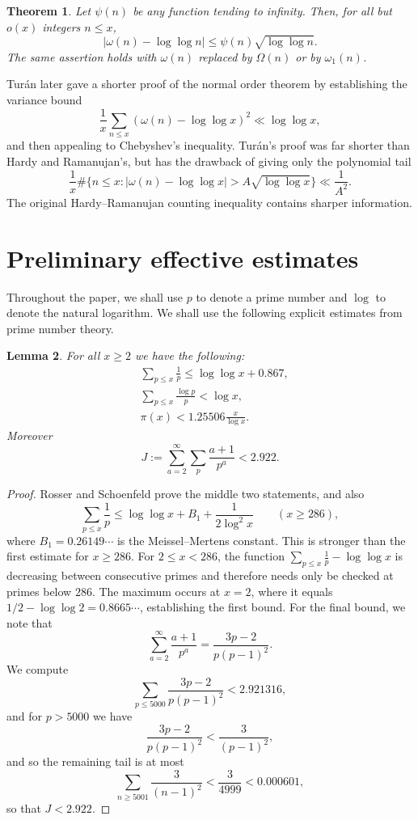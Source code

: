 \documentclass[12pt,a4paper,reqno]{amsart}
\theoremstyle{plain}
\newtheorem{thrm}{Theorem}[section]
\newtheorem{lmm}[thrm]{Lemma}
\numberwithin{sblmm}{thrm}
\numberwithin{equation}{section}
\begin{document}
\begin{thrm}\label{thm:original_HR_theorem}
    Let $\psi(n)$ be any function tending to infinity. Then, for all but $o(x)$ integers $n\le x$,
    $$|\omega(n)-\log\log n|\le\psi(n)\sqrt{\log\log n}.$$
    The same assertion holds with $\omega(n)$ replaced by $\Omega(n)$ or by $\omega_1(n)$.
\end{thrm}
Tur\'{a}n \cite{Turan1934} later gave a shorter proof of the normal order theorem by establishing the variance bound
$$\frac{1}{x}\sum_{n\le x}(\omega(n)-\log\log x)^2\ll \log\log x,$$
and then appealing to Chebyshev's inequality. Tur\'{a}n's proof was far shorter than Hardy and Ramanujan's, but has the drawback of giving only the polynomial tail 
$$\frac{1}{x}\#\{n\le x:|\omega(n)-\log\log x|>A\sqrt{\log\log x}\}\ll\frac{1}{A^2}.$$
The original Hardy--Ramanujan counting inequality contains sharper information.



\section{Preliminary effective estimates}
Throughout the paper, we shall use $p$ to denote a prime number and $\log$ to denote the natural logarithm. We shall use the following explicit estimates from prime number theory.

\begin{lmm}\label{lem:effective_prime_estimates}
    For all $x\ge 2$ we have the following:
    \begin{align}
        &\sum_{p\le x}\frac{1}{p}\le\log\log x+0.867,\label{eqn:mertens_explicit}\\
        &\sum_{p\le x}\frac{\log p}{p}<\log x,\label{eqn:chebyshev_explicit}\\
       &\pi(x)<1.25506\frac{x}{\log x}.\label{eqn:pi_explicit}
    \end{align}
    Moreover
    $$J:=\sum_{a=2}^{\infty}\sum_p\frac{a+1}{p^a}<2.922.$$
\end{lmm}
\begin{proof}
    Rosser and Schoenfeld \cite{RosserSchoenfeld1962} prove the middle two statements, and also
    $$\sum_{p\le x}\frac{1}{p}\le\log\log x+B_1+\frac{1}{2\log^2x}\qquad (x\ge 286),$$
    where $B_1=0.26149\cdots$ is the Meissel--Mertens constant. This is stronger than the first estimate for $x\ge 286$. For $2\le x<286$, the function $\sum_{p\le x}\frac{1}{p}-\log\log x$ is decreasing between consecutive primes and therefore needs only be checked at primes below $286$. The maximum occurs at $x=2$, where it equals $1/2-\log\log 2=0.8665\cdots$, establishing the first bound. For the final bound, we note that
    $$\sum_{a=2}^{\infty}\frac{a+1}{p^a}=\frac{3p-2}{p(p-1)^2}.$$
    We compute
    $$\sum_{p\le 5000}\frac{3p-2}{p(p-1)^2}<2.921316,$$
    and for $p>5000$ we have
    $$\frac{3p-2}{p(p-1)^2}<\frac{3}{(p-1)^2},$$
    and so the remaining tail is at most
    $$\sum_{n\ge 5001}\frac{3}{(n-1)^2}<\frac{3}{4999}<0.000601,$$ so that $J<2.922$.
\end{proof}
\end{document}
